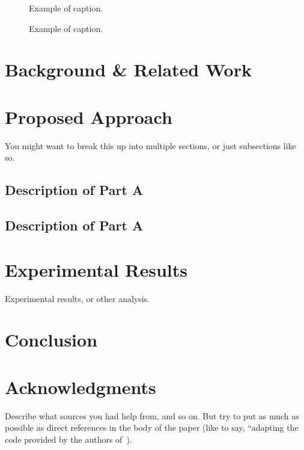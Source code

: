 \documentclass[10pt,twocolumn,letterpaper]{article}
\begin{document}
\begin{figure}[!t]
\begin{center}
\fbox{\rule{0pt}{3in} \rule{0.9\linewidth}{0pt}} %
\end{center}
   \caption{Example of caption.}
\label{fig:twocol}
\end{figure}

\begin{figure*}[!t]
\begin{center}
\fbox{\rule{0pt}{4in} \rule{0.9\linewidth}{0pt}} %
\end{center}
   \caption{Example of caption.}
\label{fig:onecol}
\end{figure*}


\section{Background \& Related Work}


\section{Proposed Approach}

You might want to break this up into multiple sections, or just subsections like so.

\subsection{Description of Part A}
\label{sec:parta}

\subsection{Description of Part A}
\label{sec:partb}

\section{Experimental Results}

Experimental results, or other analysis.

\section{Conclusion}

\section*{Acknowledgments}
Describe what sources you had help from, and so on. But try to put as much as possible as direct references in the body of the paper (like to say, ``adapting the code provided by the authors of~\cite{blah}).

{\small

}
\end{document}

